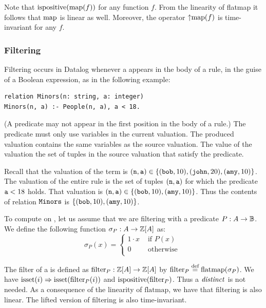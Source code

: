 Note that $\mbox{ispositive}(\mbox{map}(f))$ for any function $f$.
From the linearity of flatmap it follows that $\mbox{map}$
is linear as well.  Moreover, the operator ${\uparrow}\mbox{map}(f)$ is
time-invariant for any $f$.

\subsubsection{Filtering}\label{sec:filtering}

Filtering occurs in Datalog whenever a  appears in
the body of a rule, in the guise of a Boolean expression, as in the following example:

\noindent
\begin{lstlisting}[language=ddlog]
relation Minors(n: string, a: integer)
Minors(n, a) :- People(n, a), a < 18.
\end{lstlisting}

(A predicate may not appear in the first position in the body of a rule.)
The predicate must only use variables in the current valuation.
The produced valuation contains the same variables as the source valuation.
The value of the valuation the set of tuples in the source valuation that
satisfy the predicate.

Recall that the valuation of the term  is
$(\mbox{\texttt{n}}, \mbox{\texttt{a}}) \in \{ (\mbox{\texttt{bob}}, 10), \\ (\mbox{\texttt{john}}, 20), (\mbox{\texttt{amy}}, 10) \}$.
The valuation of the entire rule is the set of tuples $(\mbox{\texttt{n}}, \mbox{\texttt{a}})$
for which the predicate $\mbox{\texttt{a}} < 18$ holds.  That valuation is
$(\mbox{\texttt{n}}, \mbox{\texttt{a}}) \in \{ (\mbox{\texttt{bob}}, 10), (\mbox{\texttt{amy}}, 10) \}$.  Thus the contents
of relation $\mbox{\texttt{Minors}}$ is $\{ (\mbox{\texttt{bob}}, 10), (\mbox{\texttt{amy}}, 10) \}$.

To compute on \zrs, let us assume that we are filtering with a predicate $P: A \rightarrow \mathbb{B}$.
We define the following function $\sigma_P: A \rightarrow \mathbb{Z}[A]$ as:
$$\sigma_P(x) = \left\{
\begin{array}{ll}
  1 \cdot x & \mbox{ if } P(x) \\
  0 & \mbox{ otherwise } \\
\end{array}
\right.
$$

The filter of a \zr is defined as $\mbox{filter}_P: \mathbb{Z}[A]
\rightarrow \mathbb{Z}[A]$ by $\mbox{filter}_P \stackrel{\textrm{\scriptsize def}}{=}
\mbox{flatmap}(\sigma_P)$.  We have $\mbox{isset}(i) \Rightarrow
\mbox{isset}(\mbox{filter}_P(i))$ and $\mbox{ispositive}(\mbox{filter}_P)$.  Thus a $\mathit{distinct}$
is not needed.  As a consequence of the linearity of $\mbox{flatmap}$, we have
that filtering is also linear.   The lifted version of filtering is also time-invariant.

